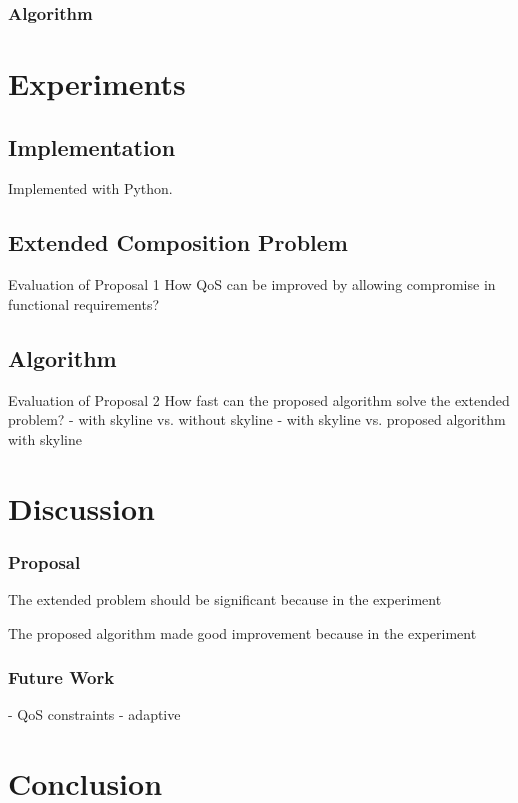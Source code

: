 \documentclass[senior,final,11pt]{iscs-thesis}
\begin{document}
\subsection{Algorithm}

\chapter{Experiments}

\section{Implementation}
Implemented with Python.

\section{Extended Composition Problem}
Evaluation of Proposal 1
How QoS can be improved by allowing compromise in functional requirements?

\section{Algorithm}
Evaluation of Proposal 2
How fast can the proposed algorithm solve the extended problem?
- with skyline vs. without skyline
- with skyline vs. proposed algorithm with skyline


\chapter{Discussion}


\subsection{Proposal}
The extended problem should be significant because in the experiment

The proposed algorithm made good improvement because in the experiment 


\subsection{Future Work}
- QoS constraints
- adaptive


\chapter{Conclusion}

 
 
\end{document}
